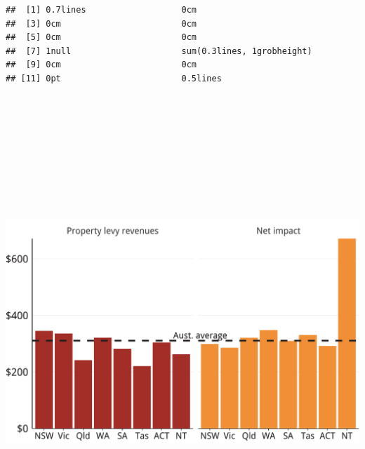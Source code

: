 \documentclass[tikz]{standalone}\usepackage[]{graphicx}\usepackage[]{color}
\makeatletter
\newenvironment{kframe}{%
 \def\at@end@of@kframe{}%
 \ifinner\ifhmode%
  \def\at@end@of@kframe{\end{minipage}}%
  \begin{minipage}{\columnwidth}%
 \fi\fi%
 \def\FrameCommand##1{\hskip\@totalleftmargin \hskip-\fboxsep
 \colorbox{shadecolor}{##1}\hskip-\fboxsep
     \hskip-\linewidth \hskip-\@totalleftmargin \hskip\columnwidth}%
 \MakeFramed {\advance\hsize-\width
   \@totalleftmargin\z@ \linewidth\hsize
   \@setminipage}}%
 {\par\unskip\endMakeFramed%
 \at@end@of@kframe}
\newenvironment{knitrout}{}{} %
\makeatother
\begin{document}
\begin{knitrout}
\color{fgcolor}\begin{kframe}
\begin{verbatim}
##  [1] 0.7lines                   0cm                       
##  [3] 0cm                        0cm                       
##  [5] 0cm                        0cm                       
##  [7] 1null                      sum(0.3lines, 1grobheight)
##  [9] 0cm                        0cm                       
## [11] 0pt                        0.5lines
\end{verbatim}
\end{kframe}
\end{knitrout}
\clearpage
\begin{knitrout}
\color{fgcolor}\begin{kframe}


{\ttfamily\noindent\bfseries{}}\end{kframe}
\end{knitrout}

\clearpage
\begin{knitrout}
\color{fgcolor}
\includegraphics[width=11.000in,height=7.00in]{./Property-taxes/atlas/figure/PROP-Figure7-1} 

\end{knitrout}
\end{document}

